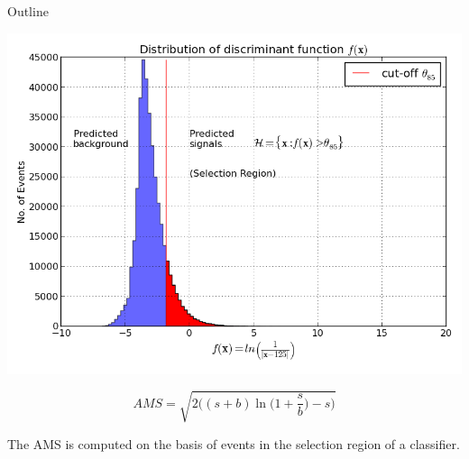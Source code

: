 \documentclass[final]{beamer}
\begin{document}
\begin{frame}{}
\begin{textblock}{20.0}
\begin{block}{Outline}
\begin{itemize}
\end{itemize}
\begin{minipage}{0.57\textwidth}
\includegraphics[width=\textwidth]{selection_region.png}
\end{minipage}
\begin{minipage}{0.3\textwidth}\raggedleft
\begin{equation*}
\scriptstyle{
\textrm{$AMS$} = \sqrt{2\bigg((s + b)\ln\bigg(1 + \frac{s}{b}\bigg)-s\bigg)} }
\end{equation*}
\raggedright The AMS is computed on the basis of events in the selection region of a classifier.
\end{minipage}
\end{block}


\end{textblock}
\end{frame}
\end{document}
